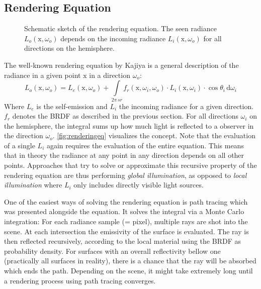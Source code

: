 \documentclass[thesis.tex]{subfiles}
\begin{document}
\subsection{Rendering Equation}
\begin{figure}[h]
\centering
{}
\caption{Schematic sketch of the rendering equation. The seen radiance $L_o(\mathrm{x}, \omega_o)$ depends on the incoming radiance $L_i(\mathrm{x}, \omega_o)$ for all directions on the hemisphere.}
\label{fig:renderingeq}
\end{figure}
The well-known rendering equation by Kajiya \cite{bib:renderingequation} is a general description of the radiance in a given point $\mathrm{x}$ in a direction $\omega_o$:
\begin{equation}
L_o(\mathrm{x}, \omega_o) = L_e(\mathrm{x}, \omega_o) + \int\limits_{2\pi\,sr} f_r(\mathrm{x}, \omega_i, \omega_o) \cdot L_i(\mathrm{x}, \omega_i) \cdot \cos\theta_i \, \mathrm{d}\omega_i
\end{equation}
Where $L_e$ is the self-emission and $L_i$ the incoming radiance for a given direction.
$f_r$ denotes the BRDF as described in the previous section.
For all directions $\omega_i$ on the hemisphere, the integral sums up how much light is reflected to a observer in the direction $\omega_o$.
\autoref{fig:renderingeq} visualizes the concept.
Note that the evaluation of a single $L_i$ again requires the evaluation of the entire equation.
This means that in theory the radiance at any point in any direction depends on all other points.
Approaches that try to solve or approximate this recursive property of the rendering equation are thus performing \emph{global illumination}, as opposed to \emph{local illumination} where $L_i$ only includes directly visible light sources.

One of the easiest ways of solving the rendering equation is path tracing which was presented alongside the equation.
It solves the integral via a Monte Carlo integration:
For each radiance sample (= pixel), multiple rays are shot into the scene.
At each intersection the emissivity of the surface is evaluated. 
The ray is then reflected recursively, according to the local material using the BRDF as probability density.
For surfaces with an overall reflectivity bellow one (practically all surfaces in reality), there is a chance that the ray will be absorbed which ends the path.
Depending on the scene, it might take extremely long until a rendering process using path tracing converges.
\end{document}
